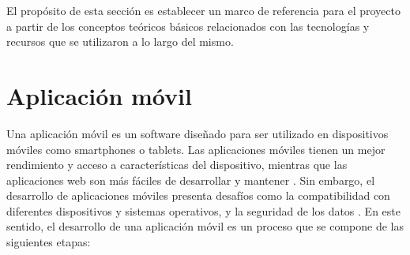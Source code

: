 
El propósito de esta sección es establecer un marco de referencia para el proyecto a partir de los conceptos teóricos básicos relacionados con las tecnologías y recursos que se utilizaron a lo largo del mismo.

\section{Aplicación móvil}
Una aplicación móvil es un software diseñado para ser utilizado en dispositivos móviles como smartphones o tablets. Las aplicaciones móviles tienen un mejor rendimiento y acceso a características del dispositivo, mientras que las aplicaciones web son más fáciles de desarrollar y mantener \cite{art:native_apps_vs_mobile_apps}. Sin embargo, el desarrollo de aplicaciones móviles presenta desafíos como la compatibilidad con diferentes dispositivos y sistemas operativos, y la seguridad de los datos \cite{art:challenges_and_best_practices}. En este sentido, el desarrollo de una aplicación móvil es un proceso que se compone de las siguientes etapas:

